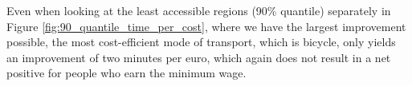 Even when looking at the least accessible regions (90\% quantile) separately in Figure \ref{fig:90_quantile_time_per_cost}, where we have the largest improvement possible, the most cost-efficient mode of transport, which is bicycle, only yields an improvement of two minutes per euro, which again does not result in a net positive for people who earn the minimum wage.



